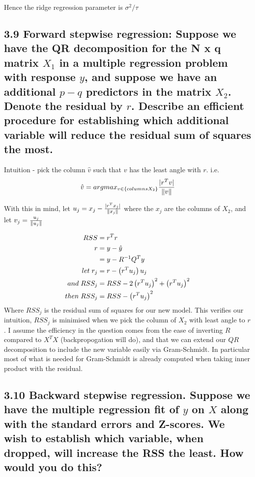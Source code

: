 Hence the ridge regression parameter is $\sigma^2 / \tau$






\subsection*{3.9 Forward stepwise regression: Suppose we have the QR decomposition for the N x q matrix $X_1$ in a multiple regression problem with response $y$, and suppose we have an additional $p-q$ predictors in the matrix $X_2$. Denote the residual by $r$. Describe an efficient procedure for establishing which additional variable will reduce the residual sum of squares the most.}

Intuition - pick the column $\hat{v}$ such that $v$ has the least angle with $r$.
i.e. $$\hat{v} = argmax_{v \in \{columns X_2\}} \frac{\lvert r^T v\rvert}{\left\lVert v\right\rVert}$$

With this in mind, let $u_j = x_j - \frac{\lvert r^T x_j\rvert}{\left\lVert x_j\right\rVert}$ where the $x_j$ are the columns of $X_2$, and let $v_j = \frac{u_j}{\left\lVert u_j\right\rVert}$

\begin{align*}
    RSS &= r^T r \\
    r &= y - \hat{y} \\
    &= y - R^{-1} Q^T y\\
    let\hspace{1mm} r_j &= r -  \left(r^T u_j\right) u_j \\
    and\hspace{1mm} RSS_j &= RSS - 2 \left(r^T u_j\right)^2  + \left(r^T u_j\right)^2\\
    then\hspace{1mm} RSS_j &= RSS -  \left(r^T u_j\right)^2\\
\end{align*}
Where $RSS_j$ is the residual sum of squares for our new model.
This verifies our intuition, $RSS_j$ is minimised when we pick the column of $X_2$ with least angle to $r$.
I assume the efficiency in the question comes from the ease of inverting $R$ compared to $X^T X$ (backpropogation will do), and that we can extend our $QR$ decomposition to include the new variable easily via Gram-Schmidt. In particular most of what is needed for Gram-Schmidt is already computed when taking inner product with the residual.






\subsection*{3.10 Backward stepwise regression. Suppose we have the multiple regression fit of $y$ on $X$ along with the standard errors and Z-scores. We wish to establish which variable, when dropped, will increase the RSS the least. How would you do this?}

